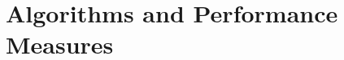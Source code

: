 \documentclass{article}
\begin{document}

\section{Algorithms and Performance Measures}
\end{document}
